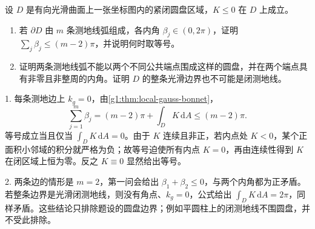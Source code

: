 \begin{exercise}
	\label{g1:ex:nonpositive-geodesic-bigon}
	设 \(D\) 是有向光滑曲面上一张坐标图内的紧闭圆盘区域，\(K\leq0\) 在 \(D\) 上成立。
	\begin{enumerate}
		\item 若 \(\partial D\) 由 \(m\) 条测地线弧组成，各内角 \(\beta_j\in(0,2\pi)\)，证明 \(\sum_j\beta_j\leq(m-2)\pi\)，并说明何时取等号。
		\item 证明两条测地线弧不能以两个不同公共端点围成这样的圆盘，并在两个端点具有非零且非整周的内角。证明 \(D\) 的整条光滑边界也不可能是闭测地线。
	\end{enumerate}
\end{exercise}
\begin{solution}
	1. 每条测地边上 \(k_g=0\)，由\cref{g1:thm:local-gauss-bonnet}，
	\[
		\sum_{j=1}^m\beta_j=(m-2)\pi+\int_DK\,\mathrm{d}A\leq(m-2)\pi.
	\]
	等号成立当且仅当 \(\int_DK\,\mathrm{d}A=0\)。由于 \(K\) 连续且非正，若内点处 \(K<0\)，某个正面积小邻域的积分就严格为负；故等号迫使所有内点 \(K=0\)，再由连续性得到 \(K\) 在闭区域上恒为零。反之 \(K\equiv0\) 显然给出等号。

	2. 两条边的情形是 \(m=2\)，第一问会给出 \(\beta_1+\beta_2\leq0\)，与两个内角都为正矛盾。若整条边界是光滑闭测地线，则没有角点、\(k_g=0\)，公式给出 \(\int_DK\,\mathrm{d}A=2\pi\)，同样矛盾。这些结论只排除题设的圆盘边界；例如平圆柱上的闭测地线不围圆盘，并不受此排除。
\end{solution}


